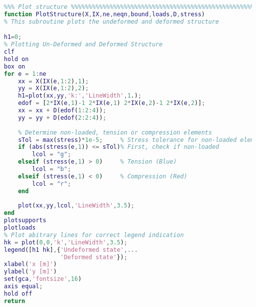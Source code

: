 \begin{lstlisting}[language=Matlab, caption = FE implementation for material non-linearity, label=lst:CodeMNA]
%%%%%%%%%%%%%%%%%%%%%%%%%%%%%%%%%%%%%%%%%%%%%%%%%%%%%%%%%%%%%%%%%%%%%%%%%%%
%%% Plot structure %%%%%%%%%%%%%%%%%%%%%%%%%%%%%%%%%%%%%%%%%%%%%%%%%%%%%%%%
function PlotStructure(X,IX,ne,neqn,bound,loads,D,stress)
% This subroutine plots the undeformed and deformed structure

h1=0;
% Plotting Un-Deformed and Deformed Structure
clf
hold on
box on
for e = 1:ne
    xx = X(IX(e,1:2),1);
    yy = X(IX(e,1:2),2);
    h1=plot(xx,yy,'k:','LineWidth',1.);
    edof = [2*IX(e,1)-1 2*IX(e,1) 2*IX(e,2)-1 2*IX(e,2)];
    xx = xx + D(edof(1:2:4));
    yy = yy + D(edof(2:2:4));
    
    % Determine non-loaded, tension or compression elements
    sTol = max(stress)*1e-5;     % Stress tolerance for non-loaded elements
    if (abs(stress(e,1)) <= sTol)% First, check if non-loaded
        lcol = "g";
    elseif (stress(e,1) > 0)     % Tension (Blue)
        lcol = "b";   
    elseif (stress(e,1) < 0)     % Compression (Red)
        lcol = "r"; 
    end      
    
    plot(xx,yy,lcol,'LineWidth',3.5);    
end
plotsupports
plotloads
% Plot abitrary lines for correct legend indication
hk = plot(0,0,'k','LineWidth',3.5);
legend([h1 hk],{'Undeformed state',...
                'Deformed state'});
xlabel('x [m]')
ylabel('y [m]')
set(gca,'fontsize',16)
axis equal;
hold off
return
\end{lstlisting}

